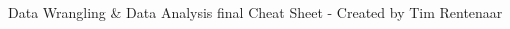 \documentclass[a4paper,7pt,landscape]{extarticle}
\begin{document}
\begin{multicols}{3}
\begin{boxA}
\end{boxA}

Data Wrangling \& Data Analysis final Cheat Sheet  - Created by Tim Rentenaar


\end{multicols}
\end{document}
